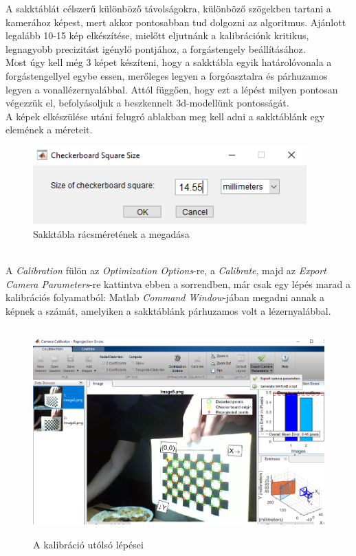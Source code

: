 \documentclass[12pt,a4paper]{article}
\begin{document}
A sakktáblát célszerű különböző távolságokra, különböző szögekben tartani a kamerához képest, mert akkor pontosabban tud dolgozni az algoritmus. Ajánlott legalább 10-15 kép elkészítése, mielőtt eljutnánk a kalibrációnk kritikus, legnagyobb precizitást igénylő pontjához, a forgástengely beállításához.\\[10pt]
Most úgy kell még 3 képet készíteni, hogy a sakktábla egyik határolóvonala a forgástengellyel egybe essen, merőleges legyen a forgóasztalra és párhuzamos legyen a vonallézernyalábbal. Attól függően, hogy ezt a lépést milyen pontosan végezzük el, befolyásoljuk a beszkennelt 3d-modellünk pontosságát.\\[10pt]
A képek elkészülése utáni felugró ablakban meg kell adni a sakktáblánk egy elemének a méreteit.\\[10pt]
\begin{figure}[h!]
	\centering
	\includegraphics[height=3cm]{images/cameraCalibrator_checkboardSize}
	\caption{Sakktábla rácsméretének a megadása}
\end{figure}\\[10pt]
A \textit{Calibration} fülön az \textit{Optimization Options}-re, a \textit{Calibrate}, majd az \textit{Export Camera Parameters}-re kattintva ebben a sorrendben, már csak egy lépés marad a kalibrációs folyamatból: Matlab \textit{Command Window}-jában megadni annak a képnek a számát, amelyiken a sakktáblánk párhuzamos volt a lézernyalábbal.

\begin{figure}[h!]
	\centering
	\includegraphics[height=8cm]{images/cameraCalibrator_exportCameraParams}
	\caption{A kalibráció utólsó lépései}
\end{figure}
\end{document}

